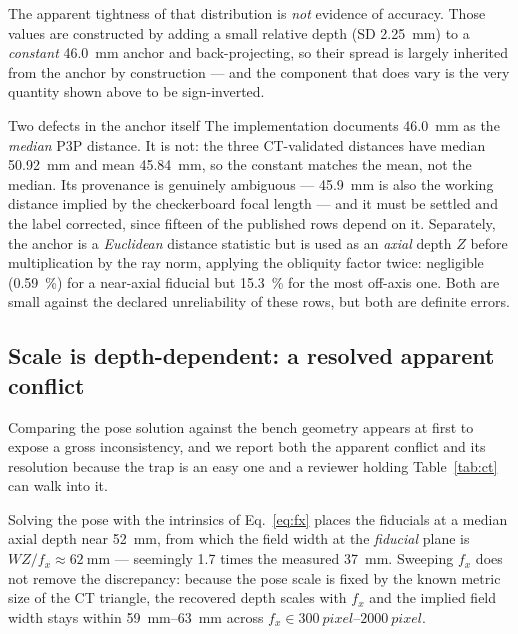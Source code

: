 \documentclass[journal,10pt]{IEEEtran}
\begin{document}
The apparent tightness of that distribution is \emph{not} evidence of accuracy.
Those values are constructed by adding a small relative depth (SD
\SI{2.25}{\milli\metre}) to a \emph{constant} \SI{46.0}{\milli\metre} anchor and
back-projecting, so their spread is largely inherited from the anchor by
construction --- and the component that does vary is the very quantity shown
above to be sign-inverted.

\begin{notebox}{Two defects in the anchor itself}
The implementation documents \SI{46.0}{\milli\metre} as the \emph{median} P3P
distance. It is not: the three CT-validated distances have median
\SI{50.92}{\milli\metre} and mean \SI{45.84}{\milli\metre}, so the constant
matches the mean, not the median. Its provenance is genuinely ambiguous ---
\SI{45.9}{\milli\metre} is also the working distance implied by the checkerboard
focal length --- and it must be settled and the label corrected, since fifteen of
the published rows depend on it. Separately, the anchor is a \emph{Euclidean}
distance statistic but is used as an \emph{axial} depth $Z$ before multiplication
by the ray norm, applying the obliquity factor twice: negligible
(\SI{0.59}{\percent}) for a near-axial fiducial but \SI{15.3}{\percent} for the
most off-axis one. Both are small against the declared unreliability of these
rows, but both are definite errors.
\end{notebox}

\subsection{Scale is depth-dependent: a resolved apparent conflict}
\label{sec:scaleplane}
Comparing the pose solution against the bench geometry appears at first to expose
a gross inconsistency, and we report both the apparent conflict and its
resolution because the trap is an easy one and a reviewer holding
Table~\ref{tab:ct} can walk into it.

Solving the pose with the intrinsics of Eq.~\eqref{eq:fx} places the fiducials at
a median axial depth near \SI{52}{\milli\metre}, from which the field width at
the \emph{fiducial} plane is $W Z/f_x \approx \SI{62}{\milli\metre}$ ---
seemingly \num{1.7} times the measured \SI{37}{\milli\metre}. Sweeping $f_x$ does
not remove the discrepancy: because the pose scale is fixed by the known metric
size of the CT triangle, the recovered depth scales with $f_x$ and the implied
field width stays within \SIrange{59}{63}{\milli\metre} across
$f_x \in \SIrange{300}{2000}{pixel}$.
\end{document}
